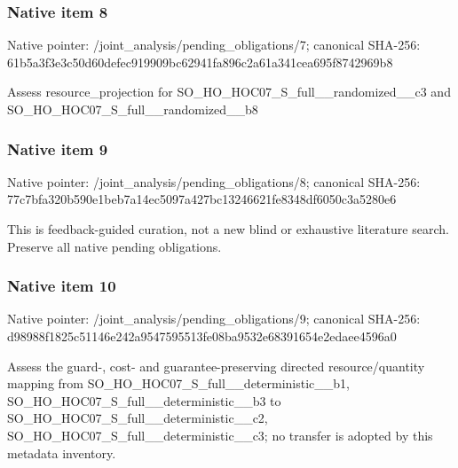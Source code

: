 \documentclass[10pt,a4paper]{article}
\begin{document}
\subsubsection{Native item 8}
Native pointer: /joint\_\allowbreak{}analysis/pending\_\allowbreak{}obligations/7; canonical SHA-256: 61b5a3f3e3c50d60defec919909bc62941fa896c2a61a341cea695f8742969b8

\begingroup\raggedright\sloppy Assess resource\_\allowbreak{}projection for SO\_\allowbreak{}HO\_\allowbreak{}HOC07\_\allowbreak{}S\_\allowbreak{}full\_\allowbreak{}\_\allowbreak{}randomized\_\allowbreak{}\_\allowbreak{}c3 and SO\_\allowbreak{}HO\_\allowbreak{}HOC07\_\allowbreak{}S\_\allowbreak{}full\_\allowbreak{}\_\allowbreak{}randomized\_\allowbreak{}\_\allowbreak{}b8\par\endgroup

\subsubsection{Native item 9}
Native pointer: /joint\_\allowbreak{}analysis/pending\_\allowbreak{}obligations/8; canonical SHA-256: 77c7bfa320b590e1beb7a14ec5097a427bc13246621fe8348df6050c3a5280e6

\begingroup\raggedright\sloppy This is feedback-guided curation,\allowbreak{} not a new blind or exhaustive literature search. Preserve all native pending obligations.\par\endgroup

\subsubsection{Native item 10}
Native pointer: /joint\_\allowbreak{}analysis/pending\_\allowbreak{}obligations/9; canonical SHA-256: d98988f1825c51146e242a9547595513fe08ba9532e68391654e2edaee4596a0

\begingroup\raggedright\sloppy Assess the guard-,\allowbreak{} cost- and guarantee-preserving directed resource/\allowbreak{}quantity mapping from SO\_\allowbreak{}HO\_\allowbreak{}HOC07\_\allowbreak{}S\_\allowbreak{}full\_\allowbreak{}\_\allowbreak{}deterministic\_\allowbreak{}\_\allowbreak{}b1,\allowbreak{} SO\_\allowbreak{}HO\_\allowbreak{}HOC07\_\allowbreak{}S\_\allowbreak{}full\_\allowbreak{}\_\allowbreak{}deterministic\_\allowbreak{}\_\allowbreak{}b3 to SO\_\allowbreak{}HO\_\allowbreak{}HOC07\_\allowbreak{}S\_\allowbreak{}full\_\allowbreak{}\_\allowbreak{}deterministic\_\allowbreak{}\_\allowbreak{}c2,\allowbreak{} SO\_\allowbreak{}HO\_\allowbreak{}HOC07\_\allowbreak{}S\_\allowbreak{}full\_\allowbreak{}\_\allowbreak{}deterministic\_\allowbreak{}\_\allowbreak{}c3;\allowbreak{} no transfer is adopted by this metadata inventory.\par\endgroup
\end{document}
